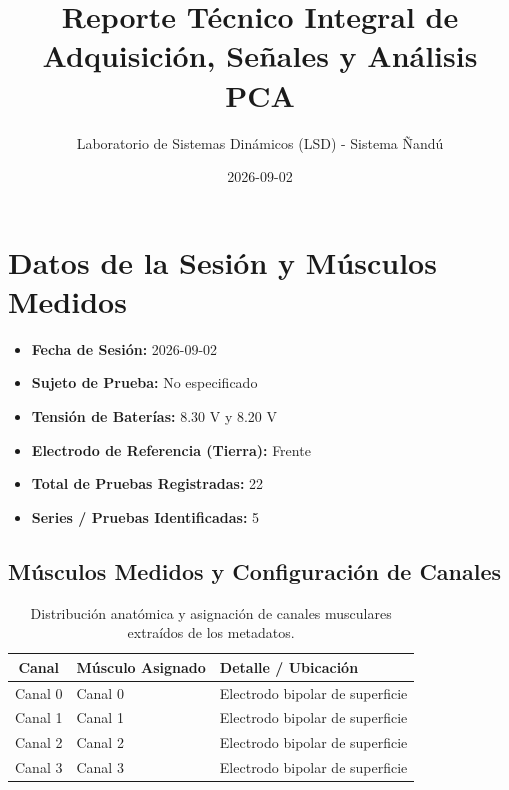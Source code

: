 \documentclass[11pt,a4paper]{article}
\title{\textbf{Reporte Técnico Integral de Adquisición, Señales y Análisis PCA}}
\author{Laboratorio de Sistemas Dinámicos (LSD) - Sistema Ñandú}
\date{2026-09-02}
\begin{document}
\maketitle

\section{Datos de la Sesión y Músculos Medidos}
\begin{itemize}
    \item \textbf{Fecha de Sesión:} 2026-09-02
    \item \textbf{Sujeto de Prueba:} No especificado
    \item \textbf{Tensión de Baterías:} 8.30 V y 8.20 V
    \item \textbf{Electrodo de Referencia (Tierra):} Frente
    \item \textbf{Total de Pruebas Registradas:} 22
    \item \textbf{Series / Pruebas Identificadas:} 5
\end{itemize}

\subsection{Músculos Medidos y Configuración de Canales}
\begin{table}[H]
\centering
\begin{tabular}{clp{9cm}}
\toprule
\textbf{Canal} & \textbf{Músculo Asignado} & \textbf{Detalle / Ubicación} \\
\midrule
Canal 0 & Canal 0 & Electrodo bipolar de superficie \\
Canal 1 & Canal 1 & Electrodo bipolar de superficie \\
Canal 2 & Canal 2 & Electrodo bipolar de superficie \\
Canal 3 & Canal 3 & Electrodo bipolar de superficie \\
\bottomrule
\end{tabular}
\caption{Distribución anatómica y asignación de canales musculares extraídos de los metadatos.}
\end{table}
\end{document}
